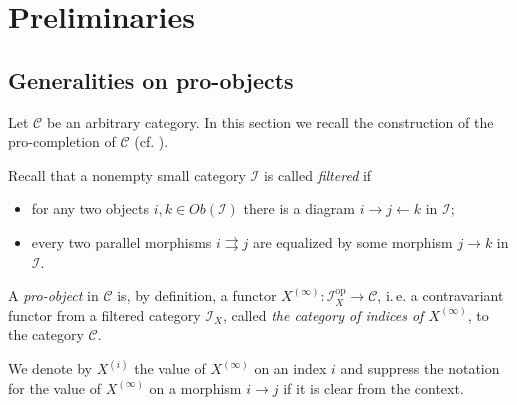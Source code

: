\documentclass{article}
\newcommand{\rar}{\rightarrow}
\newcommand{\lar}{\leftarrow}
\newcommand{\op}{\mathrm{op}}
\begin{document}
\section{Preliminaries}
\subsection{Generalities on pro-objects}
Let \(\mathcal C\) be an arbitrary category.
In this section we recall the construction of the pro-completion of \(\mathcal C\) (cf. \cite[Section~6.1]{SK06}).

Recall that a nonempty small category \(\mathcal I\) is called {\it filtered} if
\begin{itemize}
 \item for any two objects \(i, k \in Ob(\mathcal{I})\) there is a diagram \(i \rar j \lar k\) in \(\mathcal I\);
 \item every two parallel morphisms \(i \rightrightarrows j\) are equalized by some morphism \(j \rar k\) in \(\mathcal I\).
\end{itemize}
A {\it pro-object} in \(\mathcal C\) is, by definition, a functor $X^{(\infty)}\colon \mathcal{I}_X^{\op} \to \mathcal{C}$, i.\,e. a contravariant functor from a filtered category \(\mathcal I_X\), called {\it the category of indices of $X^{(\infty)}$}, to the category \(\mathcal C\). %

We denote by \(X^{(i)}\) the value of \(X^{(\infty)}\) on an index \(i\) and suppress the notation for the value of \(X^{(\infty)}\) on a morphism \(i \rar j\) if it is clear from the context.
\end{document}
